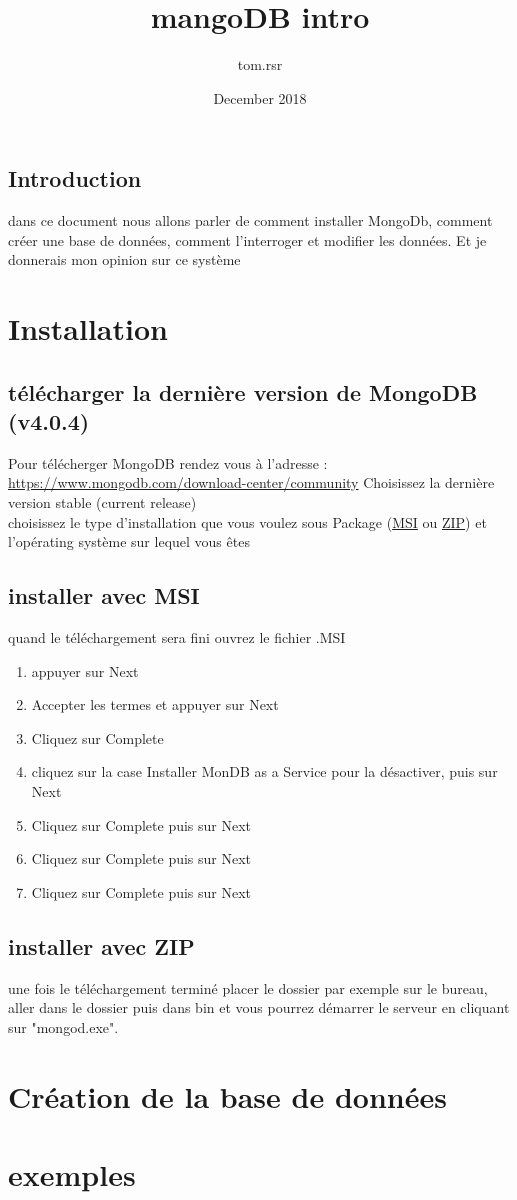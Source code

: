 \documentclass{article}
\title{mangoDB intro}
\author{tom.rsr }
\date{December 2018}
\begin{document}
\begin{titlepage}
    \maketitle
    \section{Introduction}
    dans ce document nous allons parler de comment installer MongoDb, comment créer une base de données, comment l'interroger et modifier les données. Et je donnerais mon opinion sur ce système
\end{titlepage}
\newpage
\tableofcontents
\newpage

\section{Installation}
\subsection{télécharger la dernière version de MongoDB (v4.0.4)}
Pour télécherger MongoDB rendez vous à l'adresse :\\ \url{https://www.mongodb.com/download-center/community}
Choisissez la dernière version stable (current release)\\ choisissez le type d'installation que vous voulez sous Package (\hyperref[sec:MSI]{MSI} ou \hyperref[sec:ZIP]{ZIP}) et l'opérating système sur lequel vous êtes

\subsection{installer avec MSI}
\label{sec:MSI}
quand le téléchargement sera fini ouvrez le fichier .MSI 
\begin{enumerate}
\item appuyer sur Next
\item Accepter les termes et appuyer sur Next
\item Cliquez sur Complete
\item cliquez sur la case Installer MonDB as a Service pour la désactiver, puis sur Next
\item Cliquez sur Complete puis sur Next
\item Cliquez sur Complete puis sur Next
\item Cliquez sur Complete puis sur Next
\end{enumerate}
\subsection{installer avec ZIP}
\label{sec:ZIP}
une fois le téléchargement terminé placer le dossier par exemple sur le bureau, aller dans le dossier puis dans bin et vous pourrez démarrer le serveur en cliquant sur "mongod.exe".
\section{Création de la base de données}
\section{exemples }
\end{document}
